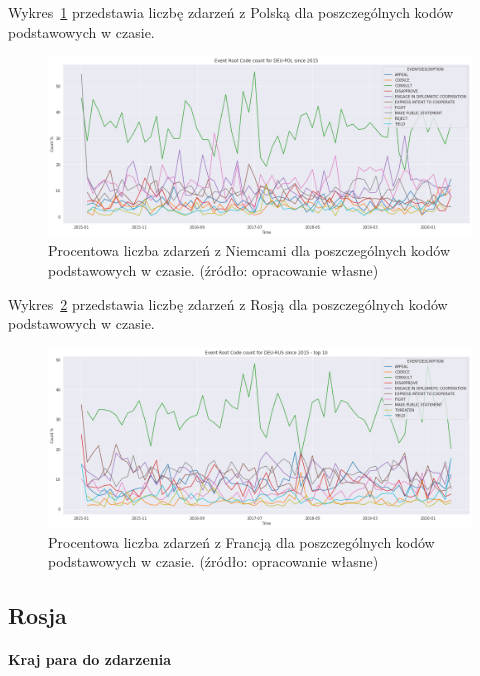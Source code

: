 \documentclass[11pt]{report}
\begin{document}
    Wykres~\ref{fig:DEUPOLERC} przedstawia liczbę zdarzeń z Polską dla poszczególnych kodów podstawowych w czasie.
    \begin{figure}[!htp]
        \centering
        \includegraphics[width=1 \textwidth]{fig/DEU/DEUPOLERCperc.png}
        \caption{Procentowa liczba zdarzeń z Niemcami dla poszczególnych kodów podstawowych w czasie. (źródło: opracowanie własne)}
        \label{fig:DEUPOLERC}
    \end{figure}

    Wykres~\ref{fig:DEURUSERC} przedstawia liczbę zdarzeń z Rosją dla poszczególnych kodów podstawowych w czasie.
    \begin{figure}[!htp]
        \centering
        \includegraphics[width=1 \textwidth]{fig/DEU/DEURUSERCperc.png}
        \caption{Procentowa liczba zdarzeń z Francją dla poszczególnych kodów podstawowych w czasie. (źródło: opracowanie własne)}
        \label{fig:DEURUSERC}
    \end{figure}

    \subsection{Rosja}

    \paragraph{Kraj para do zdarzenia}
\end{document}
